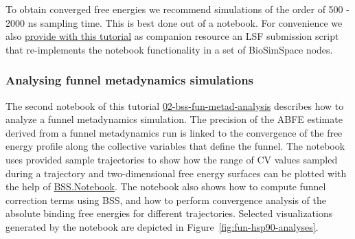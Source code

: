To obtain converged free energies we recommend simulations of the order of 500 - 2000 ns sampling time. This is best done out of a notebook. For convenience we also \href{https://github.com/OpenBioSim/BioSimSpaceTutorials/tree/main/02_funnel_metad/example_nodes}{provide with this tutorial} as companion resource an LSF submission script that re-implements the notebook functionality in a set of BioSimSpace nodes.  

\hypertarget{analysis}{%
\subsubsection{Analysing funnel metadynamics simulations}\label{analysis}}

The second notebook of this tutorial  \href{https://github.com/OpenBioSim/BioSimSpaceTutorials/blob/main/02_funnel_metad/02_bss-fun-metad-analysis.ipynb}{02-bss-fun-metad-analysis} describes how to analyze a funnel metadynamics simulation. The precision of the ABFE estimate derived from a funnel metadynamics run is linked to the convergence of the free energy profile along the collective variables that define the funnel. The notebook uses provided sample trajectories to show how the range of CV values sampled during a trajectory and two-dimensional free energy surfaces can be plotted with the help of \href{https://biosimspace.openbiosim.org/api/index_Notebook.html}{BSS.Notebook}. The notebook also shows how to compute funnel correction terms using BSS, and how to perform convergence analysis of the absolute binding free energies for different trajectories. Selected visualizations generated by the notebook are depicted in Figure~\ref{fig:fun-hsp90-analyses}. 

